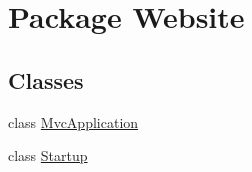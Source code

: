 \hypertarget{namespace_website}{}\section{Package Website}
\label{namespace_website}
\subsection*{Classes}
\begin{DoxyCompactItemize}
\item 
class \hyperlink{class_website_1_1_mvc_application}{Mvc\+Application}
\item 
class \hyperlink{class_website_1_1_startup}{Startup}
\end{DoxyCompactItemize}
